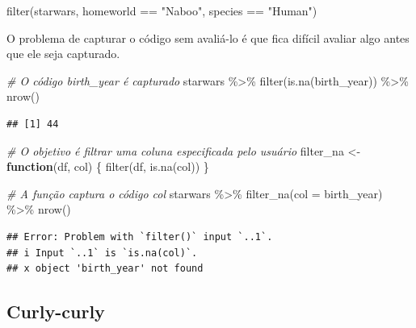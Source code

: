 \documentclass[
]{book}
\newenvironment{Shaded}{\begin{snugshade}}{\end{snugshade}}
\newcommand{\AttributeTok}[1]{\textcolor[rgb]{0.77,0.63,0.00}{#1}}
\newcommand{\CommentTok}[1]{\textcolor[rgb]{0.56,0.35,0.01}{\textit{#1}}}
\newcommand{\ControlFlowTok}[1]{\textcolor[rgb]{0.13,0.29,0.53}{\textbf{#1}}}
\newcommand{\FunctionTok}[1]{\textcolor[rgb]{0.00,0.00,0.00}{#1}}
\newcommand{\NormalTok}[1]{#1}
\newcommand{\OtherTok}[1]{\textcolor[rgb]{0.56,0.35,0.01}{#1}}
\newcommand{\SpecialCharTok}[1]{\textcolor[rgb]{0.00,0.00,0.00}{#1}}
\newcommand{\StringTok}[1]{\textcolor[rgb]{0.31,0.60,0.02}{#1}}
\begin{document}
\begin{Shaded}
\begin{Highlighting}[]
\FunctionTok{filter}\NormalTok{(starwars, homeworld }\SpecialCharTok{==} \StringTok{"Naboo"}\NormalTok{, species }\SpecialCharTok{==} \StringTok{"Human"}\NormalTok{)}
\end{Highlighting}
\end{Shaded}

O problema de capturar o código sem avaliá-lo é que fica difícil avaliar algo antes que ele seja capturado.

\begin{Shaded}
\begin{Highlighting}[]
\CommentTok{\# O código \textquotesingle{}birth\_year\textquotesingle{} é capturado}
\NormalTok{starwars }\SpecialCharTok{\%\textgreater{}\%} \FunctionTok{filter}\NormalTok{(}\FunctionTok{is.na}\NormalTok{(birth\_year)) }\SpecialCharTok{\%\textgreater{}\%} \FunctionTok{nrow}\NormalTok{()}
\end{Highlighting}
\end{Shaded}

\begin{verbatim}
## [1] 44
\end{verbatim}

\begin{Shaded}
\begin{Highlighting}[]
\CommentTok{\# O objetivo é filtrar uma coluna especificada pelo usuário}
\NormalTok{filter\_na }\OtherTok{\textless{}{-}} \ControlFlowTok{function}\NormalTok{(df, col) \{}
  \FunctionTok{filter}\NormalTok{(df, }\FunctionTok{is.na}\NormalTok{(col))}
\NormalTok{\}}

\CommentTok{\# A função captura o código \textquotesingle{}col\textquotesingle{}}
\NormalTok{starwars }\SpecialCharTok{\%\textgreater{}\%} \FunctionTok{filter\_na}\NormalTok{(}\AttributeTok{col =}\NormalTok{ birth\_year) }\SpecialCharTok{\%\textgreater{}\%} \FunctionTok{nrow}\NormalTok{()}
\end{Highlighting}
\end{Shaded}

\begin{verbatim}
## Error: Problem with `filter()` input `..1`.
## i Input `..1` is `is.na(col)`.
## x object 'birth_year' not found
\end{verbatim}

\hypertarget{curly-curly}{%
\subsection{Curly-curly}\label{curly-curly}}
\end{document}
